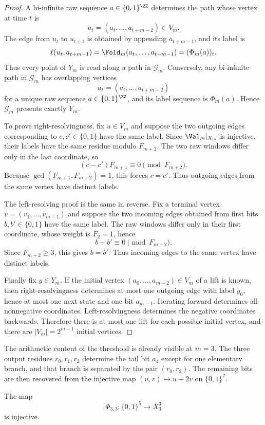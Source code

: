 \begin{proof}
A bi-infinite raw sequence $a\in\{0,1\}^{\ZZ}$ determines the path whose
vertex at time $t$ is
\[
u_t=(a_t,\ldots,a_{t+m-2})\in V_m.
\]
The edge from $u_t$ to $u_{t+1}$ is obtained by appending $a_{t+m-1}$, and its
label is
\[
\ell(u_t,a_{t+m-1})=\Fold_m(a_t,\ldots,a_{t+m-1})=(\Phi_m(a))_t.
\]
Thus every point of $Y_m$ is read along a path in $\mathcal G_m$.  Conversely,
any bi-infinite path in $\mathcal G_m$ has overlapping vertices
\[
u_t=(a_t,\ldots,a_{t+m-2})
\]
for a unique raw sequence $a\in\{0,1\}^{\ZZ}$, and its label sequence is
$\Phi_m(a)$.  Hence $\mathcal G_m$ presents exactly $Y_m$.

To prove right-resolvingness, fix $u\in V_m$ and suppose the two outgoing
edges corresponding to $c,c'\in\{0,1\}$ have the same label.  Since
$\Val_m|_{X_m}$ is injective, their labels have the same residue modulo
$F_{m+2}$.  The two raw windows differ only in the last coordinate, so
\[
(c-c')F_{m+1}\equiv0\pmod {F_{m+2}}.
\]
Because $\gcd(F_{m+1},F_{m+2})=1$, this forces $c=c'$.  Thus outgoing edges
from the same vertex have distinct labels.

The left-resolving proof is the same in reverse.  Fix a terminal vertex
$v=(v_1,\ldots,v_{m-1})$ and suppose the two incoming edges obtained from
first bits $b,b'\in\{0,1\}$ have the same label.  The raw windows differ only
in their first coordinate, whose weight is $F_2=1$, hence
\[
b-b'\equiv0\pmod {F_{m+2}}.
\]
Since $F_{m+2}\ge3$, this gives $b=b'$.  Thus incoming edges to the same
vertex have distinct labels.

Finally fix $y\in Y_m$.  If the initial vertex
$(a_0,\ldots,a_{m-2})\in V_m$ of a lift is known, then right-resolvingness
determines at most one outgoing edge with label $y_0$, hence at most one next
state and one bit $a_{m-1}$.  Iterating forward determines all nonnegative
coordinates.  Left-resolvingness determines the negative coordinates
backwards.  Therefore there is at most one lift for each possible initial
vertex, and there are $|V_m|=2^{m-1}$ initial vertices.
\end{proof}

The arithmetic content of the threshold is already visible at $m=3$. The three
output residues $r_0,r_1,r_2$ determine the tail bit $a_4$ except for one
elementary branch, and that branch is separated by the pair $(r_0,r_2)$. The
remaining bits are then recovered from the injective map $(u,v)\mapsto u+2v$
on $\{0,1\}^2$.

\begin{lemma}\label{lem:m3-decoder}
The map
\[
\Phi_{3,3}:\{0,1\}^{5}\longrightarrow X_3^3
\]
is injective.
\end{lemma}

